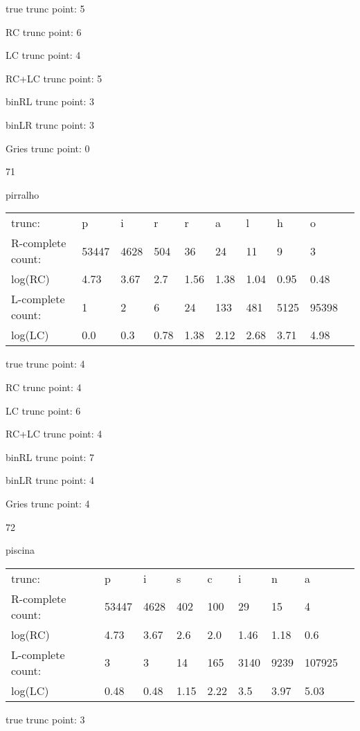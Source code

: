 \documentclass[10pt]{article}
\begin{document}
true trunc point: 5

RC trunc point: 6

LC trunc point: 4

RC+LC trunc point: 5

binRL trunc point: 3

binLR trunc point: 3

Gries trunc point: 0

\vspace{1em}

71

pirralho

\begin{tabular}{l|lllllllll}
trunc: & p & i & r & r & a & l & h & o & \\ 
R-complete count: & 53447 & 4628 & 504 & 36 & 24 & 11 & 9 & 3 & \\ 
log(RC) & 4.73 & 3.67 & 2.7 & 1.56 & 1.38 & 1.04 & 0.95 & 0.48 & \\ 
L-complete count: & 1 & 2 & 6 & 24 & 133 & 481 & 5125 & 95398 & \\ 
log(LC) & 0.0 & 0.3 & 0.78 & 1.38 & 2.12 & 2.68 & 3.71 & 4.98 & \\ 
\end{tabular}

true trunc point: 4

RC trunc point: 4

LC trunc point: 6

RC+LC trunc point: 4

binRL trunc point: 7

binLR trunc point: 4

Gries trunc point: 4

\vspace{1em}

72

piscina

\begin{tabular}{l|llllllll}
trunc: & p & i & s & c & i & n & a & \\ 
R-complete count: & 53447 & 4628 & 402 & 100 & 29 & 15 & 4 & \\ 
log(RC) & 4.73 & 3.67 & 2.6 & 2.0 & 1.46 & 1.18 & 0.6 & \\ 
L-complete count: & 3 & 3 & 14 & 165 & 3140 & 9239 & 107925 & \\ 
log(LC) & 0.48 & 0.48 & 1.15 & 2.22 & 3.5 & 3.97 & 5.03 & \\ 
\end{tabular}

true trunc point: 3
\end{document}
